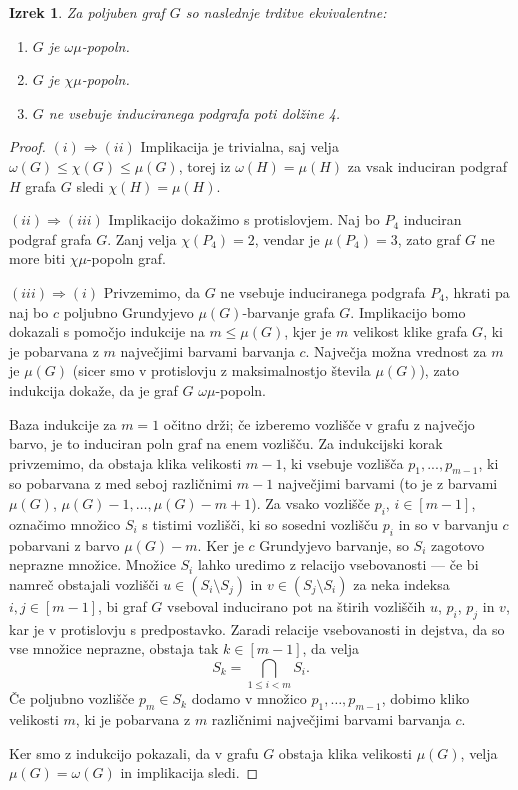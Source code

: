\documentclass[12pt,a4paper,twoside]{article}
\theoremstyle{definition} %
\theoremstyle{plain} %
\newtheorem{izrek}[definicija]{Izrek}
\numberwithin{equation}{section}  %
\begin{document}
\begin{izrek}\label{grundyjevaKarakterizacija}
Za poljuben graf $G$ so naslednje trditve ekvivalentne:
\begin{enumerate}[label=(\roman*)]
\item $G$ je $\omega\mu$-popoln.
\item $G$ je $\chi\mu$-popoln.
\item $G$ ne vsebuje induciranega podgrafa poti dolžine 4.
\end{enumerate}
\end{izrek}

\begin{proof} $(i) \Rightarrow (ii)$ Implikacija je trivialna, saj velja $\omega(G) \leq \chi(G) \leq \mu(G)$, torej iz $\omega(H) = \mu(H)$ za vsak induciran podgraf $H$ grafa $G$ sledi $\chi(H) = \mu(H)$.

\medskip
$(ii) \Rightarrow (iii)$ Implikacijo dokažimo s protislovjem. Naj bo $P_4$ induciran podgraf grafa $G$. Zanj velja $\chi(P_4)=2$, vendar je $\mu(P_4) = 3$, zato graf $G$ ne more biti $\chi\mu$-popoln graf.

\medskip
$(iii) \Rightarrow (i)$ Privzemimo, da $G$ ne vsebuje induciranega podgrafa $P_4$, hkrati pa naj bo $c$ poljubno Grundyjevo $\mu(G)$-barvanje grafa $G$. Implikacijo bomo dokazali s pomočjo indukcije na $m \leq \mu(G)$, kjer je $m$ velikost klike grafa $G$, ki je pobarvana z $m$ največjimi barvami barvanja $c$. Največja možna vrednost za $m$ je $\mu(G)$ (sicer smo v protislovju z maksimalnostjo števila $\mu(G)$), zato indukcija dokaže, da je graf $G$ $\omega\mu$-popoln.

Baza indukcije za $m=1$ očitno drži; če izberemo vozlišče v grafu z največjo barvo, je to induciran poln graf na enem vozlišču. Za indukcijski korak privzemimo, da obstaja klika velikosti $m-1$, ki vsebuje vozlišča $p_1, ..., p_{m-1}$, ki so pobarvana z med seboj različnimi $m-1$ največjimi barvami (to je z barvami $\mu(G)$, $\mu(G) - 1, \dots, \mu(G) - m + 1$). Za vsako vozlišče $p_i$, $i \in [m-1]$, označimo množico $S_i$ s tistimi vozlišči, ki so sosedni vozlišču $p_i$ in so v barvanju $c$ pobarvani z barvo $\mu(G) - m$. Ker je $c$ Grundyjevo barvanje, so $S_i$ zagotovo neprazne množice. Množice $S_i$ lahko uredimo z relacijo vsebovanosti --- če bi namreč obstajali vozlišči $u \in (S_i \setminus S_j)$ in $v\in (S_j \setminus S_i)$ za neka indeksa $i,j \in [m-1]$, bi graf $G$ vseboval inducirano pot na štirih vozliščih $u$, $p_i$, $p_j$ in $v$, kar je v protislovju s predpostavko. Zaradi relacije vsebovanosti in dejstva, da so vse množice neprazne, obstaja tak $k \in [m-1]$, da velja $$S_k = \bigcap_{1 \leq i < m} S_i.$$ Če poljubno vozlišče $p_m \in S_k$ dodamo v množico $p_1, \dots, p_{m-1}$, dobimo kliko velikosti $m$, ki je pobarvana z $m$ različnimi največjimi barvami barvanja $c$.

Ker smo z indukcijo pokazali, da v grafu $G$ obstaja klika velikosti $\mu(G)$, velja $\mu(G) = \omega(G)$ in implikacija sledi.\end{proof}
\end{document}
